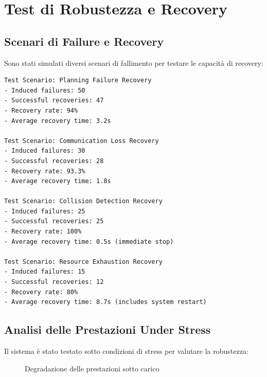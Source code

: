 \documentclass[12pt,a4paper,twoside,openright]{book}
\begin{document}
\section{Test di Robustezza e Recovery}

\subsection{Scenari di Failure e Recovery}

Sono stati simulati diversi scenari di fallimento per testare le capacità di recovery:

\begin{lstlisting}[caption={Risultati test di recovery automatico}]
Test Scenario: Planning Failure Recovery
- Induced failures: 50
- Successful recoveries: 47
- Recovery rate: 94%
- Average recovery time: 3.2s

Test Scenario: Communication Loss Recovery  
- Induced failures: 30
- Successful recoveries: 28
- Recovery rate: 93.3%
- Average recovery time: 1.8s

Test Scenario: Collision Detection Recovery
- Induced failures: 25
- Successful recoveries: 25
- Recovery rate: 100%
- Average recovery time: 0.5s (immediate stop)

Test Scenario: Resource Exhaustion Recovery
- Induced failures: 15
- Successful recoveries: 12
- Recovery rate: 80%
- Average recovery time: 8.7s (includes system restart)
\end{lstlisting}

\subsection{Analisi delle Prestazioni Under Stress}

Il sistema è stato testato sotto condizioni di stress per valutare la robustezza:

\begin{figure}[H]
\centering
{}
\caption{Degradazione delle prestazioni sotto carico}
\label{fig:stress_performance}
\end{figure}
\end{document}
